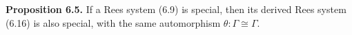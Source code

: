 \textbf{Proposition 6.5.} If a Rees system (6.9) is special, then its derived Rees system (6.16) is also special, with the same automorphism $\theta : \Gamma \cong \Gamma$.
